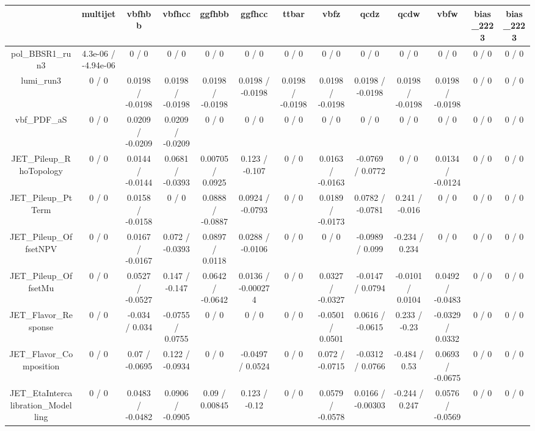 \documentclass[10pt]{article}
\begin{document}
\begin{table}[htbp]
\begin{center}
\begin{tabular}{|c|c|c|c|c|c|c|c|c|c|c|c|c|}
\hline 
      & multijet      & vbfhbb      & vbfhcc      & ggfhbb      & ggfhcc      & ttbar      & vbfz      & qcdz      & qcdw      & vbfw      & bias_2223      & bias_2223 \\ 
\hline 
  pol_BBSR1_run3 & 4.3e-06 / -4.94e-06 & 0 / 0 & 0 / 0 & 0 / 0 & 0 / 0 & 0 / 0 & 0 / 0 & 0 / 0 & 0 / 0 & 0 / 0 & 0 / 0 & 0 / 0 \\ 
  lumi_run3 & 0 / 0 & 0.0198 / -0.0198 & 0.0198 / -0.0198 & 0.0198 / -0.0198 & 0.0198 / -0.0198 & 0.0198 / -0.0198 & 0.0198 / -0.0198 & 0.0198 / -0.0198 & 0.0198 / -0.0198 & 0.0198 / -0.0198 & 0 / 0 & 0 / 0 \\ 
  vbf_PDF_aS & 0 / 0 & 0.0209 / -0.0209 & 0.0209 / -0.0209 & 0 / 0 & 0 / 0 & 0 / 0 & 0 / 0 & 0 / 0 & 0 / 0 & 0 / 0 & 0 / 0 & 0 / 0 \\ 
  JET_Pileup_RhoTopology & 0 / 0 & 0.0144 / -0.0144 & 0.0681 / -0.0393 & 0.00705 / 0.0925 & 0.123 / -0.107 & 0 / 0 & 0.0163 / -0.0163 & -0.0769 / 0.0772 & 0 / 0 & 0.0134 / -0.0124 & 0 / 0 & 0 / 0 \\ 
  JET_Pileup_PtTerm & 0 / 0 & 0.0158 / -0.0158 & 0 / 0 & 0.0888 / -0.0887 & 0.0924 / -0.0793 & 0 / 0 & 0.0189 / -0.0173 & 0.0782 / -0.0781 & 0.241 / -0.016 & 0 / 0 & 0 / 0 & 0 / 0 \\ 
  JET_Pileup_OffsetNPV & 0 / 0 & 0.0167 / -0.0167 & 0.072 / -0.0393 & 0.0897 / 0.0118 & 0.0288 / -0.0106 & 0 / 0 & 0 / 0 & -0.0989 / 0.099 & -0.234 / 0.234 & 0 / 0 & 0 / 0 & 0 / 0 \\ 
  JET_Pileup_OffsetMu & 0 / 0 & 0.0527 / -0.0527 & 0.147 / -0.147 & 0.0642 / -0.0642 & 0.0136 / -0.000274 & 0 / 0 & 0.0327 / -0.0327 & -0.0147 / 0.0794 & -0.0101 / 0.0104 & 0.0492 / -0.0483 & 0 / 0 & 0 / 0 \\ 
  JET_Flavor_Response & 0 / 0 & -0.034 / 0.034 & -0.0755 / 0.0755 & 0 / 0 & 0 / 0 & 0 / 0 & -0.0501 / 0.0501 & 0.0616 / -0.0615 & 0.233 / -0.23 & -0.0329 / 0.0332 & 0 / 0 & 0 / 0 \\ 
  JET_Flavor_Composition & 0 / 0 & 0.07 / -0.0695 & 0.122 / -0.0934 & 0 / 0 & -0.0497 / 0.0524 & 0 / 0 & 0.072 / -0.0715 & -0.0312 / 0.0766 & -0.484 / 0.53 & 0.0693 / -0.0675 & 0 / 0 & 0 / 0 \\ 
  JET_EtaIntercalibration_Modelling & 0 / 0 & 0.0483 / -0.0482 & 0.0906 / -0.0905 & 0.09 / 0.00845 & 0.123 / -0.12 & 0 / 0 & 0.0579 / -0.0578 & 0.0166 / -0.00303 & -0.244 / 0.247 & 0.0576 / -0.0569 & 0 / 0 & 0 / 0 \\ 

\end{tabular}
\end{center}
\end{table}
\end{document}
